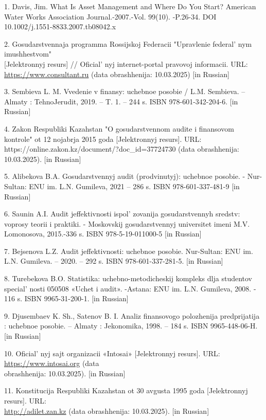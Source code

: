 \begin{references}
1. Davis, Jim. What Is Asset Management and Where Do You Start? American
Water Works Association Journal.-2007.-Vol. 99(10). -P.26-34. DOI
10.1002/j.1551-8833.2007.tb08042.x

2. Gosudarstvennaja programma Rossijskoj Federacii "Upravlenie
federal' nym imushhestvom" \\{[}Jelektronnyj resurs{]} //
Oficial' nyj internet-portal pravovoj informacii. URL:
\href{https://www.consultant.ru/document/cons\_doc\_LAW\_155198/}{https://www.consultant.ru} (data
obrashhenija: 10.03.2025) {[}in Russian{]}

3. Sembieva L. M. Vvedenie v finansy: uchebnoe posobie / L.M. Sembieva.
-- Almaty : TehnoJerudit, 2019. -- T. 1. -- 244 s. ISBN
978-601-342-204-6. {[}in Russian{]}

4. Zakon Respubliki Kazahstan "O gosudarstvennom audite i finansovom
kontrole" ot 12 nojabrja 2015 goda {[}Jelektronnyj resurs{]}. URL:
https://online.zakon.kz/document/?doc\_id=37724730 (data obrashhenija:
10.03.2025). {[}in Russian{]}

5. Alibekova B.A. Gosudarstvennyj audit (prodvinutyj): uchebnoe posobie.
- Nur-Sultan: ENU im. L.N. Gumileva, 2021 -- 286 s. ISBN
978-601-337-481-9 {[}in Russian{]}

6. Saunin A.I. Audit jeffektivnosti ispol' zovanija
gosudarstvennyh sredstv: voprosy teorii i praktiki. - Moskovskij
gosudarstvennyj universitet imeni M.V. Lomonosova, 2015.-336 s. ISBN
978-5-19-011000-5 {[}in Russian{]}

7. Bejsenova L.Z. Audit jeffektivnosti: uchebnoe posobie. Nur-Sultan: ENU
im. L.N. Gumileva. -- 2020. -- 292 s. ISBN 978-601-337-281-5. {[}in
Russian{]}

8. Turebekova B.O. Statistika: uchebno-metodicheskij kompleks dlja
studentov special' nosti 050508 «Uchet i audit».
-Astana: ENU im. L.N. Gumileva, 2008. - 116 s. ISBN 9965-31-200-1.
{[}in Russian{]}

9. Djusembaev K. Sh., Satenov B. I. Analiz finansovogo polozhenija
predprijatija : uchebnoe posobie. -- Almaty : Jekonomika, 1998. -- 184
s. ISBN 9965-448-06-H. {[}in Russian{]}

10. Oficial' nyj sajt organizacii «Intosai» {[}Jelektronnyj
resurs{]}. URL: \href{https://www.intosai.org}{https://www.intosai.org} (data \\obrashhenija:
10.03.2025). {[}in Russian{]}

11. Konstitucija Respubliki Kazahstan ot 30 avgusta 1995 goda
{[}Jelektronnyj resurs{]}. URL:\\
\href{http://adilet.zan.kz/rus/docs/K950001000\_\#z42}{http://adilet.zan.kz} (data obrashhenija:
10.03.2025). {[}in Russian{]}


\end{references}
